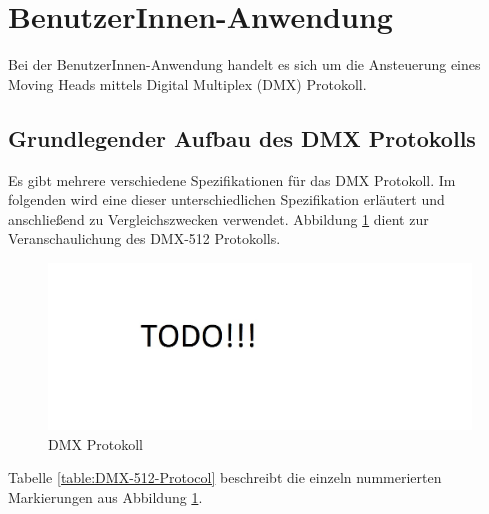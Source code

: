 \section{BenutzerInnen-Anwendung}

Bei der BenutzerInnen-Anwendung handelt es sich um die Ansteuerung eines Moving Heads mittels  Digital Multiplex (DMX) Protokoll.  

\subsection{Grundlegender Aufbau des DMX Protokolls}
Es gibt mehrere verschiedene Spezifikationen für das DMX Protokoll. Im folgenden wird eine dieser unterschiedlichen Spezifikation erläutert und anschließend zu Vergleichszwecken verwendet. Abbildung \ref{fig:DMX-512-Protocol} dient zur Veranschaulichung des DMX-512 Protokolls. 


\begin{figure}[H]
	\includegraphics[scale=0.60]{chapters/userapplication/figures/todo}
	\caption{DMX Protokoll}
	\label{fig:DMX-512-Protocol}
\end{figure}

Tabelle \ref{table:DMX-512-Protocol} beschreibt die einzeln nummerierten Markierungen aus Abbildung \ref{fig:DMX-512-Protocol}.


